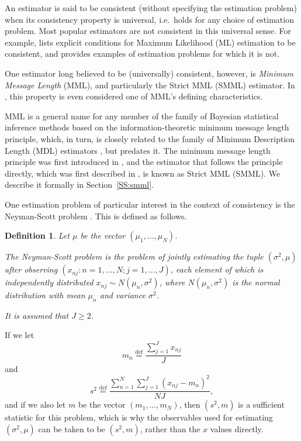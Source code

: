 \documentclass{IEEEtran}
\newcommand{\citet}[1]{\cite{#1}}
\newcommand{\citep}[1]{\cite{#1}}
\newcommand{\defeq}{\stackrel{\text{def}}{=}}
\newtheorem{defi}{Definition}
\begin{document}
An estimator is said to be consistent (without specifying the estimation
problem) when its consistency property is universal, i.e.\ holds for any choice
of estimation problem. Most popular estimators are not consistent in this
universal sense. For example, \citet{lehmann2006theory} lists explicit
conditions for Maximum Likelihood (ML) estimation to be consistent, and
provides examples of estimation problems for which it is not.

One estimator long believed to be (universally) consistent, however,
\citep{DoweBaxterOliverWallace1998,dowe1997resolving,DoweGardnerOppy2007,BarronCover1991}
is \emph{Minimum Message Length} (MML), and particularly the
Strict MML (SMML) estimator. In \citet{dowe2011mml}, this property is even
considered one of MML's defining characteristics.

MML is a general name for any member
of the family of Bayesian statistical inference methods based on the
information-theoretic minimum message length principle,
which, in turn, is closely related to the family of Minimum Description Length
(MDL) estimators
\citep{rissanen1985minimum,rissanen1987stochastic,rissanen1999hypothesis},
but predates it.
The minimum message length principle
was first introduced in \citet{WallaceBoulton1968}, and the
estimator that follows the principle directly, which was first described in
\citet{wallace1975invariant}, is known as Strict MML (SMML).
We describe it formally in Section~\ref{SS:smml}.

One estimation problem of particular interest in the context of consistency
is the Neyman-Scott problem \citep{neyman1948consistent}.
This is defined as follows.

\begin{defi}
Let $\mu$ be the vector $(\mu_1,\ldots,\mu_N)$.

The \emph{Neyman-Scott problem}
is the problem of jointly estimating the tuple
$(\sigma^2,\mu)$ after observing
$(x_{nj} : n=1,\ldots,N; j=1,\ldots,J)$, each element of which is independently
distributed $x_{nj} \sim N(\mu_n,\sigma^2)$, where $N(\mu_n,\sigma^2)$ is the
normal distribution with mean $\mu_n$ and variance $\sigma^2$.

It is assumed that $J\ge 2$.
\end{defi}

If we let
\[
m_n \defeq \frac{\sum_{j=1}^{J} x_{nj}}{J}
\]
and
\[
s^2 \defeq \frac{\sum_{n=1}^{N} \sum_{j=1}^{J} (x_{nj}-m_n)^2}{NJ},
\]
and if we also let $m$ be the vector $(m_1,\ldots,m_N)$, then $(s^2,m)$ is a
sufficient statistic for this problem, which is why the observables used for
estimating $(\sigma^2,\mu)$ can be taken to be $(s^2,m)$, rather than the
$x$ values directly.
\end{document}
